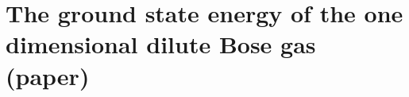 \chapter{The ground state energy of the one dimensional dilute Bose gas (paper)}
\label{ChapterTheGroundStateEnergyOfTheOneDimensionalDiluteBoseGas}
